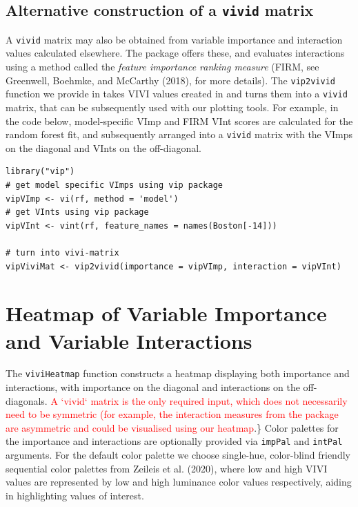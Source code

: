 \hypertarget{sec:vip2vivid}{%
\subsection{\texorpdfstring{Alternative construction of a \texttt{vivid} matrix}{Alternative construction of a vivid matrix}}\label{sec:vip2vivid}}

A \texttt{vivid} matrix may also be obtained from variable importance and interaction values calculated elsewhere. The package  offers these, and evaluates interactions using a method called the \emph{feature importance ranking measure} (FIRM, see Greenwell, Boehmke, and McCarthy (2018), for more details). The \texttt{vip2vivid} function we provide in  takes VIVI values created in  and turns them into a \texttt{vivid} matrix, that can be subsequently used with our plotting tools. For example, in the code below, model-specific VImp and FIRM VInt scores are calculated for the random forest fit, and subsequently arranged into a \texttt{vivid} matrix with the VImps on the diagonal and VInts on the off-diagonal.

\begin{verbatim}
library("vip")
# get model specific VImps using vip package
vipVImp <- vi(rf, method = 'model')
# get VInts using vip package
vipVInt <- vint(rf, feature_names = names(Boston[-14]))

# turn into vivi-matrix
vipViviMat <- vip2vivid(importance = vipVImp, interaction = vipVInt)
\end{verbatim}

\hypertarget{sec:heatmapSec}{%
\section{Heatmap of Variable Importance and Variable Interactions}\label{sec:heatmapSec}}

The \texttt{viviHeatmap} function constructs a heatmap displaying both importance and interactions, with importance on the diagonal and interactions on the off-diagonals. \textcolor{red}{ A `vivid` matrix is the only required input, which does not necessarily need to be symmetric (for example, the interaction measures from the  package are asymmetric and could be visualised using our heatmap}.\} Color palettes for the importance and interactions are optionally provided via \texttt{impPal} and \texttt{intPal} arguments.
For the default color palette we choose single-hue, color-blind friendly sequential color palettes from Zeileis et al. (2020), where low and high VIVI values are represented by low and high luminance color values respectively, aiding in highlighting values of interest.

